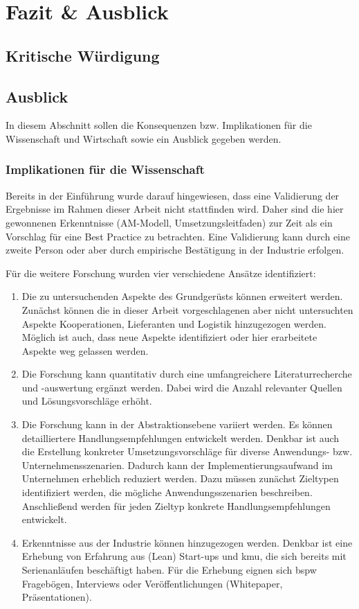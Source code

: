\chapter{Fazit \& Ausblick}\label{sec:fazit}

\section{Kritische Würdigung}

\section{Ausblick}

In diesem Abschnitt sollen die Konsequenzen bzw. Implikationen für die Wissenschaft und Wirtschaft sowie ein Ausblick gegeben werden. 

\subsection*{Implikationen für die Wissenschaft}
Bereits in der Einführung wurde darauf hingewiesen, dass eine Validierung der Ergebnisse im Rahmen dieser Arbeit nicht stattfinden wird. Daher sind die hier gewonnenen Erkenntnisse (AM-Modell, Umsetzungsleitfaden) zur Zeit als ein Vorschlag für eine Best Practice zu betrachten. Eine Validierung kann durch eine zweite Person %
oder aber durch empirische Bestätigung in der Industrie erfolgen. 

Für die weitere Forschung wurden vier verschiedene Ansätze identifiziert: 

\begin{enumerate}
 \item Die zu untersuchenden Aspekte des Grundgerüsts können erweitert werden. Zunächst können die in dieser Arbeit vorgeschlagenen aber nicht untersuchten Aspekte Kooperationen, Lieferanten und Logistik %
 hinzugezogen werden. Möglich ist auch, dass neue Aspekte identifiziert oder hier erarbeitete Aspekte weg gelassen werden. 
\item Die Forschung kann quantitativ durch eine umfangreichere Literaturrecherche und -auswertung ergänzt werden. Dabei wird die Anzahl relevanter Quellen und Lösungsvorschläge erhöht. 
\item Die Forschung kann in der Abstraktionsebene variiert werden. Es können detailliertere Handlungsempfehlungen entwickelt werden. Denkbar ist auch die Erstellung konkreter Umsetzungsvorschläge für diverse Anwendungs- bzw. Unternehmensszenarien. Dadurch kann der Implementierungsaufwand im Unternehmen erheblich reduziert werden. Dazu müssen zunächst Zieltypen identifiziert werden, die mögliche Anwendungsszenarien beschreiben. Anschließend werden für jeden Zieltyp konkrete Handlungsempfehlungen entwickelt. 
\item Erkenntnisse aus der Industrie können hinzugezogen werden. Denkbar ist eine Erhebung von Erfahrung aus (Lean) Start-ups und \gls{kmu}, die sich bereits mit Serienanläufen beschäftigt haben. Für die Erhebung eignen sich \gls{bspw} Fragebögen, Interviews oder Veröffentlichungen (Whitepaper, Präsentationen). 
\end{enumerate}



